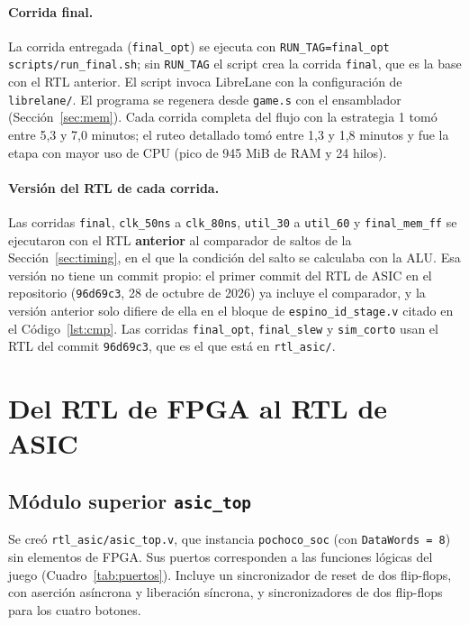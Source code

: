\documentclass[11pt,letterpaper]{article}
\newcommand{\code}[1]{\texttt{#1}}
\begin{document}
\paragraph{Corrida final.} La corrida entregada (\code{final\_opt}) se ejecuta con \code{RUN\_TAG=final\_opt scripts/run\_final.sh}; sin \code{RUN\_TAG} el script crea la corrida \code{final}, que es la base con el RTL anterior. El script invoca LibreLane con la configuración de \code{librelane/}. El programa se regenera desde \code{game.s} con el ensamblador (Sección~\ref{sec:mem}). Cada corrida completa del flujo con la estrategia 1 tomó entre 5,3 y 7,0 minutos; el ruteo detallado tomó entre 1,3 y 1,8 minutos y fue la etapa con mayor uso de CPU (pico de 945 MiB de RAM y 24 hilos).

\paragraph{Versión del RTL de cada corrida.} Las corridas \code{final}, \code{clk\_50ns} a \code{clk\_80ns}, \code{util\_30} a \code{util\_60} y \code{final\_mem\_ff} se ejecutaron con el RTL \textbf{anterior} al comparador de saltos de la Sección~\ref{sec:timing}, en el que la condición del salto se calculaba con la ALU. Esa versión no tiene un commit propio: el primer commit del RTL de ASIC en el repositorio (\code{96d69c3}, 28 de octubre de 2026) ya incluye el comparador, y la versión anterior solo difiere de ella en el bloque de \code{espino\_id\_stage.v} citado en el Código~\ref{lst:cmp}. Las corridas \code{final\_opt}, \code{final\_slew} y \code{sim\_corto} usan el RTL del commit \code{96d69c3}, que es el que está en \code{rtl\_asic/}.

\section{Del RTL de FPGA al RTL de ASIC}
\label{sec:rtl}

\subsection{Módulo superior \texorpdfstring{\code{asic\_top}}{asic\_top}}

Se creó \code{rtl\_asic/asic\_top.v}, que instancia \code{pochoco\_soc} (con \code{DataWords = 8}) sin elementos de FPGA. Sus puertos corresponden a las funciones lógicas del juego (Cuadro~\ref{tab:puertos}). Incluye un sincronizador de reset de dos flip-flops, con aserción asíncrona y liberación síncrona, y sincronizadores de dos flip-flops para los cuatro botones.
\end{document}
